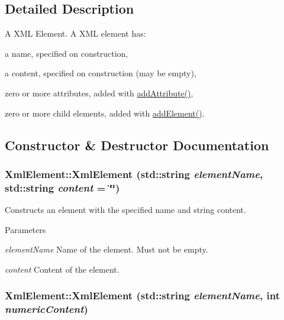 \subsection{Detailed Description}
A XML Element. A XML element has:
\begin{DoxyItemize}
\item a name, specified on construction,
\item a content, specified on construction (may be empty),
\item zero or more attributes, added with \hyperlink{classXmlElement_a14387be9ca6d014a38e95a7aa98f86c5}{addAttribute()},
\item zero or more child elements, added with \hyperlink{classXmlElement_a444321a1de2a7f52994c53f9e6e0d942}{addElement()}. 
\end{DoxyItemize}

\subsection{Constructor \& Destructor Documentation}
\hypertarget{classXmlElement_a94d6c15e996994d62316b198f369d675}{
\subsubsection[{XmlElement}]{\setlength{\rightskip}{0pt plus 5cm}XmlElement::XmlElement (std::string {\em elementName}, \/  std::string {\em content} = {\ttfamily \char`\"{}\char`\"{}})}}
\label{classXmlElement_a94d6c15e996994d62316b198f369d675}


Constructs an element with the specified name and string content. 


\begin{DoxyParams}{Parameters}
\item[{\em elementName}]Name of the element. Must not be empty. \item[{\em content}]Content of the element. \end{DoxyParams}
\hypertarget{classXmlElement_a879b90d96dc87b6f7ebb9c67ba92cb73}{
\subsubsection[{XmlElement}]{\setlength{\rightskip}{0pt plus 5cm}XmlElement::XmlElement (std::string {\em elementName}, \/  int {\em numericContent})}}
\label{classXmlElement_a879b90d96dc87b6f7ebb9c67ba92cb73}


